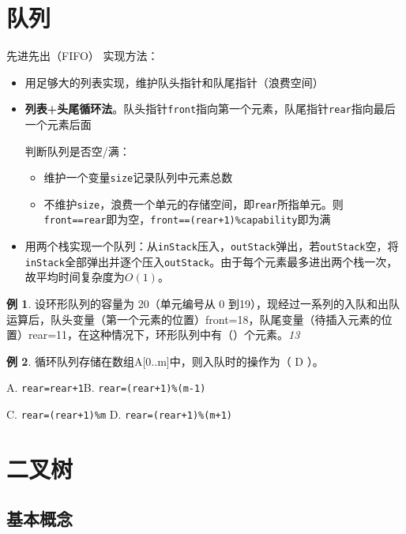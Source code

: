 \documentclass[hyperref,a4paper,UTF8,12pt]{ctexart}
\theoremstyle{definition}
\newtheorem{example}{例}[section]
\begin{document}
\section{队列}
先进先出（FIFO）
实现方法：
\begin{itemize}
    \item 用足够大的列表实现，维护队头指针和队尾指针（浪费空间）
    \item \textbf{列表+头尾循环法}。队头指针\verb|front|指向第一个元素，队尾指针\verb|rear|指向最后一个元素后面

    判断队列是否空/满：
        \begin{itemize}
            \item 维护一个变量\verb|size|记录队列中元素总数
            \item 不维护\verb|size|，浪费一个单元的存储空间，即\verb|rear|所指单元。则\verb|front==rear|即为空，\verb|front==(rear+1)%capability|即为满
        \end{itemize}
    \item 用两个栈实现一个队列：从\verb|inStack|压入，\verb|outStack|弹出，若\verb|outStack|空，将\verb|inStack|全部弹出并逐个压入\verb|outStack|。由于每个元素最多进出两个栈一次，故平均时间复杂度为$O(1)$。
\end{itemize}
\begin{example}
    设环形队列的容量为 20（单元编号从 0 到19），现经过一系列的入队和出队运算后，队头变量（第一个元素的位置）front=18，队尾变量（待插入元素的位置）rear=11，在这种情况下，环形队列中有（\quad）个元素。\quad\textit{13}
\end{example}
\begin{example}
    循环队列存储在数组A[0..m]中，则入队时的操作为（ D ）。

A. \verb|rear=rear+1|\quad            B. \verb|rear=(rear+1)%(m-1)|

 C. \verb|rear=(rear+1)%m|  \quad  D. \verb|rear=(rear+1)%(m+1)|
\end{example}

\section{二叉树}

\subsection{基本概念}
\end{document}

